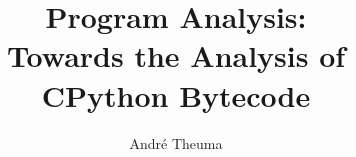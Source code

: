 \documentclass[oneside]{um-fict}  %
\title{Program Analysis:\\Towards the Analysis of\\CPython Bytecode}  %
\author{André Theuma}            %
\begin{document}
\frontmatter 
    \maketitle
    \if@openright\cleardoublepage\else\clearpage\fi
    \tableofcontents*\if@openright\cleardoublepage\else\clearpage\fi
    \listoffigures\if@openright\cleardoublepage\else\clearpage\fi
    \listoftables\if@openright\cleardoublepage\else\clearpage\fi
    \if@openright\cleardoublepage\else\clearpage\fi

\mainmatter 
     
    
    
    
    

{%
    \if@openright\cleardoublepage\else\clearpage\fi
    
    {\scriptsize}
	\printindex
}

\appendix
	    
\end{document}
